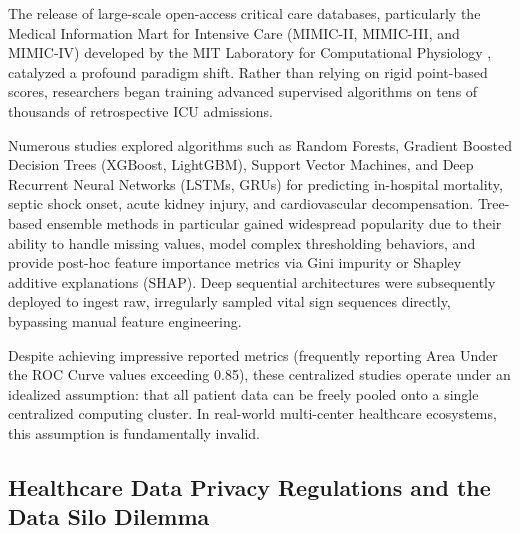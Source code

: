 The release of large-scale open-access critical care databases, particularly the Medical Information Mart for Intensive Care (MIMIC-II, MIMIC-III, and MIMIC-IV) developed by the MIT Laboratory for Computational Physiology \citep{johnson2023mimic, goldberger2000physiobank}, catalyzed a profound paradigm shift. Rather than relying on rigid point-based scores, researchers began training advanced supervised algorithms on tens of thousands of retrospective ICU admissions.

Numerous studies explored algorithms such as Random Forests, Gradient Boosted Decision Trees (XGBoost, LightGBM), Support Vector Machines, and Deep Recurrent Neural Networks (LSTMs, GRUs) for predicting in-hospital mortality, septic shock onset, acute kidney injury, and cardiovascular decompensation. Tree-based ensemble methods in particular gained widespread popularity due to their ability to handle missing values, model complex thresholding behaviors, and provide post-hoc feature importance metrics via Gini impurity or Shapley additive explanations (SHAP). Deep sequential architectures were subsequently deployed to ingest raw, irregularly sampled vital sign sequences directly, bypassing manual feature engineering.

Despite achieving impressive reported metrics (frequently reporting Area Under the ROC Curve values exceeding 0.85), these centralized studies operate under an idealized assumption: that all patient data can be freely pooled onto a single centralized computing cluster. In real-world multi-center healthcare ecosystems, this assumption is fundamentally invalid.

\subsection{Healthcare Data Privacy Regulations and the Data Silo Dilemma}
\label{subsec:privacy_regulations}


